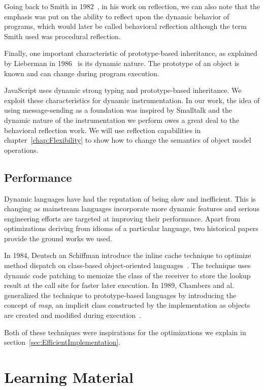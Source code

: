 Going back to Smith in 1982~\cite{Smith:1982}, in his work on reflection, we
can also note that the emphasis was put on the ability to reflect upon the
dynamic behavior of programs, which would later be called behavioral reflection
although the term Smith used was procedural reflection.

Finally, one important characteristic of prototype-based inheritance, as
explained by Lieberman in 1986~\cite{Lieberman:1986} is its dynamic nature. The
prototype of an object is known and can change during program execution.

JavaScript uses dynamic strong typing and prototype-based inheritance.  We
exploit these characteristics for dynamic instrumentation. In our work, the
idea of using message-sending as a foundation was inspired by Smalltalk  and
the dynamic nature of the instrumentation we perform owes a great deal to the
behavioral reflection work. We will use reflection capabilities in
chapter~\ref{chap:Flexibility} to show how to change the semantics of object
model operations.

\subsection{Performance}

Dynamic languages have had the reputation of being slow and inefficient. This
is changing as mainstream languages incorporate more dynamic features and
serious engineering efforts are targeted at improving their performance. Apart
from optimizations deriving from idioms of a particular language, two historical
papers provide the ground works we used.

In 1984, Deutsch an Schiffman introduce the inline cache technique to optimize
method dispatch on class-based object-oriented languages~\cite{Deutsch:1984}.
The technique uses dynamic code patching to memoize the class of the receiver
to store the lookup result at the call site for faster later execution. In
1989, Chambers and al. generalized the technique to prototype-based languages
by introducing the concept of \textit{map}, an implicit class constructed by
the implementation as objects are created and modified during
execution~\cite{self}.

Both of these techniques were inspirations for the optimizations we explain in
section~\ref{sec:EfficientImplementation}.

\section{Learning Material}

